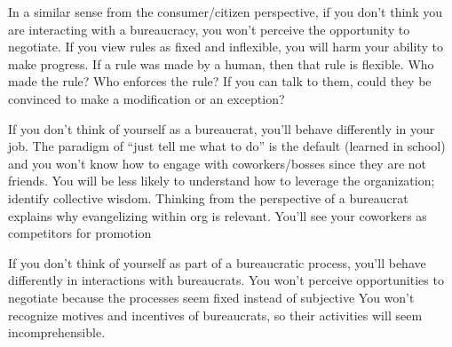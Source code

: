 In a similar sense from the consumer/citizen perspective, if you don't think you are interacting with a bureaucracy, you won't perceive the opportunity to negotiate.  If you view rules as fixed and inflexible, you will harm your ability to make progress. If a rule was made by a human, then that rule is flexible. Who made the rule? Who enforces the rule? If you can talk to them, could they be convinced to make a modification or an exception?

If you don't think of yourself as a bureaucrat, you'll behave differently in your job. The paradigm of ``just tell me what to do'' is the default (learned in school) and you won't know how to engage with coworkers/bosses since they are not friends. You will be less likely to understand how to leverage the organization; identify collective wisdom. Thinking from the perspective of a bureaucrat explains why evangelizing within org is relevant. 
You'll see your coworkers as competitors for promotion

If you don't think of yourself as part of a bureaucratic process, you'll behave differently in interactions with bureaucrats.  You won't perceive opportunities to negotiate because the processes seem fixed instead of subjective
You won't recognize motives and incentives of bureaucrats, so their activities will seem incomprehensible.



